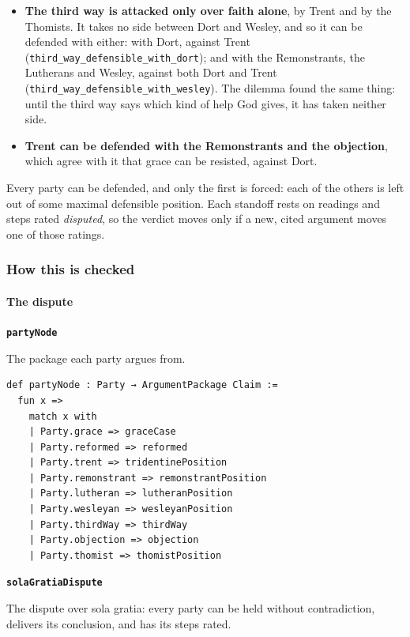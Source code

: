 \documentclass[11pt]{article}
\begin{document}
\begin{itemize}
  \item \textbf{The third way is attacked only over faith alone}, by Trent and by the Thomists. It takes no side between Dort and Wesley, and so it can be defended with either: with Dort, against Trent (\texttt{third\_\allowbreak{}way\_\allowbreak{}defensible\_\allowbreak{}with\_\allowbreak{}dort}); and with the Remonstrants, the Lutherans and Wesley, against both Dort and Trent (\texttt{third\_\allowbreak{}way\_\allowbreak{}defensible\_\allowbreak{}with\_\allowbreak{}wesley}). The dilemma found the same thing: until the third way says which kind of help God gives, it has taken neither side.
  \item \textbf{Trent can be defended with the Remonstrants and the objection}, which agree with it that grace can be resisted, against Dort.
\end{itemize}
Every party can be defended, and only the first is forced: each of the others is left out of some maximal defensible position. Each standoff rests on readings and steps rated \emph{disputed}, so the verdict moves only if a new, cited argument moves one of those ratings.

\subsubsection*{How this is checked}
\paragraph*{The dispute}
\leavevmode\par\nobreak
\par\medskip\noindent\textbf{\texttt{party\allowbreak{}Node}}\par\nobreak\noindent
The package each party argues from.

{\small\begin{verbatim}
def partyNode : Party → ArgumentPackage Claim :=
  fun x =>
    match x with
    | Party.grace => graceCase
    | Party.reformed => reformed
    | Party.trent => tridentinePosition
    | Party.remonstrant => remonstrantPosition
    | Party.lutheran => lutheranPosition
    | Party.wesleyan => wesleyanPosition
    | Party.thirdWay => thirdWay
    | Party.objection => objection
    | Party.thomist => thomistPosition
\end{verbatim}}
\par\medskip\noindent\textbf{\texttt{sola\allowbreak{}Gratia\allowbreak{}Dispute}}\par\nobreak\noindent
The dispute over sola gratia: every party can be held without contradiction, delivers its conclusion, and has its steps rated.
\end{document}
